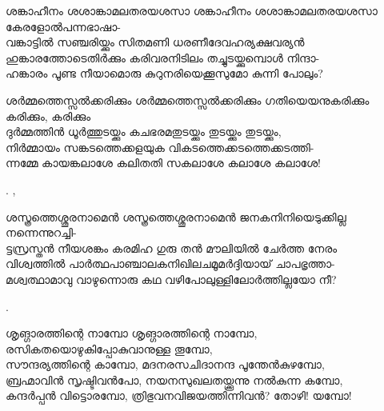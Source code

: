 \begin{enumerate}

\begin{slokam}{\VSr}{\VenM}{ശങ്കാഹീനം ശശാങ്കാമലതരയശസാ}
ശങ്കാഹീനം ശശാങ്കാമലതരയശസാ കേരളോൽപന്നഭാഷാ-\\
വങ്കാട്ടിൽ സഞ്ചരിയ്ക്കും സിതമണി ധരണീദേവഹര്യക്ഷവര്യൻ\\
ഹുങ്കാരത്തോടെതിർക്കും കരിവരനിടിലം തച്ചുടയ്ക്കുമ്പൊള്‍ നിന്ദാ-\\
ഹങ്കാരം പൂണ്ട നീയാമൊരു കുറുനരിയെക്കൂസുമോ കുന്നി പോലും?
\end{slokam}


\begin{slokam}{\VSr}{\Unk}{ശർമ്മത്തെസ്സൽക്കരിക്കും}
ശർമ്മത്തെസ്സൽക്കരിക്കും ഗതിയെയനുകരിക്കും കരിക്കും, കരിക്കും\\
ദുർമ്മത്തിൻ ധൂർത്തുടയ്ക്കും കചഭരമതുടയ്ക്കും തുടയ്ക്കും തുടയ്ക്കും,\\
നിർമ്മായം സങ്കടത്തെക്കളയുക വികടത്തെക്കടത്തെക്കടത്തി-\\
ന്നമ്മേ കായങ്കലാശേ കലിതതി സകലാശേ കലാശേ കലാശേ!
\end{slokam}


.  ,


\begin{slokam}{\VSr}{\PKV}{ശസ്ത്രത്തെശ്ശൂരനാമെൻ}
ശസ്ത്രത്തെശ്ശൂരനാമെൻ ജനകനിനിയെടുക്കില്ല നന്നെന്നുറച്ചി-\\
ട്ടസ്രസ്തൻ നീയശങ്കം കരമിഹ ഗുരു തൻ മൗലിയിൽ ചേർത്ത നേരം\\
വിശ്വത്തിൽ പാർത്ഥപാഞ്ചാലകനിഖിലചമൂമർദ്ദിയായ്‌ ചാപഭൃത്താ-\\
മശ്വത്ഥാമാവു വാഴുന്നൊരു കഥ വഴിപോലുള്ളിലോർത്തില്ലയോ നീ?
\end{slokam}


. 

\begin{slokam}{\VSr}{\GRT}{ശൃങ്ഗാരത്തിന്റെ നാമ്പോ}
ശൃങ്ഗാരത്തിന്റെ നാമ്പോ, രസികതയൊഴുകിപ്പോകുവാനുള്ള തൂമ്പോ,\\
സൗന്ദര്യത്തിന്റെ കാമ്പോ, മദനരസചിദാനന്ദ പൂന്തേൻകുഴമ്പോ,\\
ബ്രഹ്മാവിൻ സൃഷ്ടിവൻപോ, നയനസുഖലതയ്ക്കൂന്നു നൽകുന്ന കമ്പോ,\\
കന്ദർപ്പൻ വിട്ടൊരമ്പോ, ത്രിഭുവനവിജയത്തിന്നിവൻ? തോഴി! യമ്പോ!
\end{slokam}


\end{enumerate}
